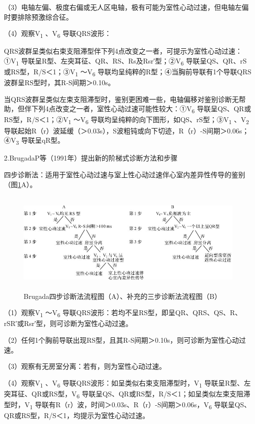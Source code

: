 （3）电轴左偏、极度右偏或无人区电轴，极有可能为室性心动过速，但电轴左偏时要排除预激综合征。

（4）观察V\textsubscript{1} 、V\textsubscript{6} 导联QRS波形：

QRS波群呈类似右束支阻滞型伴下列4点改变之一者，可提示为室性心动过速：①V\textsubscript{1}
导联呈R型、左突耳征、QR、RS、Rs及Rsr′型；②V\textsubscript{6}
导联呈QS、QR、rS或RS型，R/S＜1；③V\textsubscript{1} ～V\textsubscript{6}
导联均呈纯粹的R型；④当胸前导联有1个导联QRS波群呈RS型时，其R-S间期＞0.10s。

当QRS波群呈类似左束支阻滞型时，鉴别更困难一些，电轴偏移对鉴别诊断无帮助，但伴下列4点改变之一者，室性心动过速可能性较大：①V\textsubscript{6}
导联呈QS、QR或RS型，R/S＜1；②V\textsubscript{1} ～V\textsubscript{6}
导联均呈纯粹的向下图形，如QS、rS型；③V\textsubscript{1}
、V\textsubscript{2}
导联起始R（r）波延缓（＞0.03s），S波粗钝或向下切迹，R（r）-S间期＞0.06s；④V\textsubscript{3}
导联呈qR型。

2.BrugadaP等（1991年）提出新的阶梯式诊断方法和步骤

四步诊断法：适用于室性心动过速与室上性心动过速伴心室内差异性传导的鉴别（图\ref{fig31-9}A）。

\begin{figure}[!htbp]
 \centering
 \includegraphics[width=5.53125in,height=1.96875in]{./images/Image00512.jpg}
 \captionsetup{justification=centering}
 \caption{Brugada四步诊断法流程图（A）、补充的三步诊断法流程图（B）}
 \label{fig31-9}
  \end{figure} 

（1）观察V\textsubscript{1} ～V\textsubscript{6}
导联QRS波形：若均不呈RS型，即呈QR、QRS、QS、R、rSR′或Rsr′型，则可诊断为室性心动过速。

（2）任何1个胸前导联出现RS型，且其R-S间期＞0.10s，则可诊断为室性心动过速。

（3）观察有无房室分离：若有，则为室性心动过速。

（4）观察V\textsubscript{1} 、V\textsubscript{6}
导联QRS波形：如呈类似右束支阻滞型时，V\textsubscript{1}
导联呈R型、左突耳征、QR或RS型，V\textsubscript{6}
导联呈QS、QR或RS型，R/S＜1；如呈类似左束支阻滞型时，V\textsubscript{1}
导联有R（r）波，时间＞0.03s、R（r）-S间期＞0.06s，V\textsubscript{6}
导联呈QS、QR或RS型，R/S＜1，均提示为室性心动过速。

